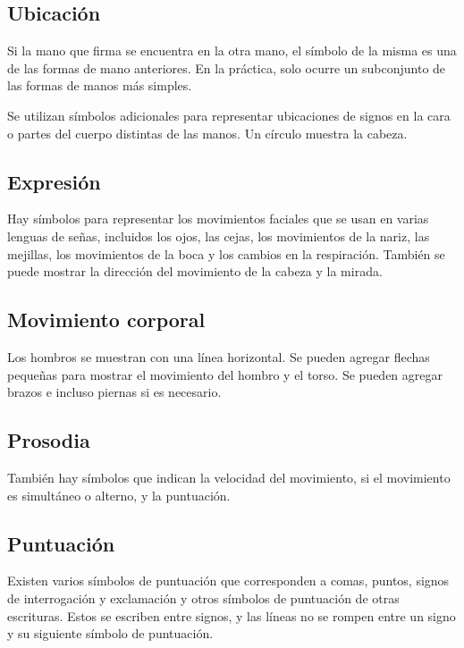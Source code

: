 \subsection{Ubicación}\label{subsection:state-of-the-art:sl:location}

Si la mano que firma se encuentra en la otra mano, el símbolo de la misma es una de las formas de mano anteriores. En la práctica, solo ocurre un subconjunto de las formas de manos más simples.

Se utilizan símbolos adicionales para representar ubicaciones de signos en la cara o partes del cuerpo distintas de las manos. Un círculo muestra la cabeza.

\subsection{Expresión}\label{subsection:state-of-the-art:sl:expression}
Hay símbolos para representar los movimientos faciales que se usan en varias lenguas de señas, incluidos los ojos, las cejas, los movimientos de la nariz, las mejillas, los movimientos de la boca y los cambios en la respiración. También se puede mostrar la dirección del movimiento de la cabeza y la mirada.

\subsection{Movimiento corporal}\label{subsection:state-of-the-art:sl:body_movement}
Los hombros se muestran con una línea horizontal. Se pueden agregar flechas pequeñas para mostrar el movimiento del hombro y el torso. Se pueden agregar brazos e incluso piernas si es necesario.

\subsection{Prosodia}\label{subsection:state-of-the-art:sl:prosody}

También hay símbolos que indican la velocidad del movimiento, si el movimiento es simultáneo o alterno, y la puntuación.

\subsection{Puntuación}\label{subsection:state-of-the-art:sl:punctuation}
Existen varios símbolos de puntuación que corresponden a comas, puntos, signos de interrogación y exclamación y otros símbolos de puntuación de otras escrituras. Estos se escriben entre signos, y las líneas no se rompen entre un signo y su siguiente símbolo de puntuación.

